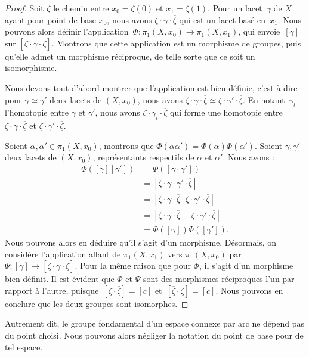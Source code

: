 \begin{proof}
Soit $\zeta$ le chemin entre $x_0=\zeta(0)$ et $x_1=\zeta(1)$. Pour un lacet~$\gamma$ de $X$ ayant pour point de base $x_0$, nous avons $\zeta\cdot\gamma\cdot\overline{\zeta}$ qui est un lacet basé en~$x_1$. Nous pouvons alors définir l'application~$\Phi:\pi_1(X,x_0)\to\pi_1(X,x_1)$, qui envoie~$[\gamma]$ sur $[\zeta\cdot\gamma\cdot\overline{\zeta}]$. Montrons que cette application est un morphisme de groupes, puis qu'elle admet un morphisme réciproque, de telle sorte que ce soit un isomorphisme.

Nous devons tout d'abord montrer que l'application est bien définie, c'est à dire pour $\gamma\simeq\gamma'$ deux lacets de $(X,x_0)$, nous avons $\zeta\cdot\gamma\cdot\overline{\zeta}\simeq\zeta\cdot\gamma'\cdot\overline{\zeta}$. En notant~$\gamma_t$ l'homotopie entre $\gamma$ et $\gamma'$, nous avons $\zeta\cdot\gamma_t\cdot\overline{\zeta}$ qui forme une homotopie entre $\zeta\cdot\gamma\cdot\overline{\zeta}$ et $\zeta\cdot\gamma'\cdot\overline{\zeta}$.

\bigskip Soient $\alpha,\alpha'\in\pi_1(X,x_0)$, montrons que $\Phi(\alpha\alpha')=\Phi(\alpha)\Phi(\alpha')$. Soient $\gamma,\gamma'$ deux lacets de $(X,x_0)$, représentants respectifs de $\alpha$ et $\alpha'$. Nous avons : \[\begin{split}
\Phi([\gamma][\gamma'])&=\Phi([\gamma\cdot\gamma'])\\
&=[\zeta\cdot\gamma\cdot\gamma'\cdot\overline{\zeta}]\\
&=[\zeta\cdot\gamma\cdot\overline{\zeta}\cdot\zeta\cdot\gamma'\cdot\overline{\zeta}]\\
&=[\zeta\cdot\gamma\cdot\overline{\zeta}][\zeta\cdot\gamma'\cdot\overline{\zeta}]\\
&=\Phi([\gamma])\Phi([\gamma']).
\end{split}\] Nous pouvons alors en déduire qu'il s'agit d'un morphisme. Désormais, on considère l'application allant de $\pi_1(X,x_1)$ vers $\pi_1(X,x_0)$ par~$\Psi:[\gamma]\mapsto[\overline{\zeta}\cdot\gamma\cdot\zeta]$. Pour la même raison que pour $\Phi$, il s'agit d'un morphisme bien définit. Il est évident que $\Phi$ et $\Psi$ sont des morphismes réciproques l'un par rapport à l'autre, puisque~$[\zeta\cdot\overline{\zeta}]=[c]$ et~$[\overline{\zeta}\cdot\zeta]=[c]$. Nous pouvons en conclure que les deux groupes sont isomorphes.
\end{proof}
\begin{remark}
Autrement dit, le groupe fondamental d'un espace connexe par arc ne dépend pas du point choisi. Nous pouvons alors négliger la notation du point de base pour de tel espace.
\end{remark}

